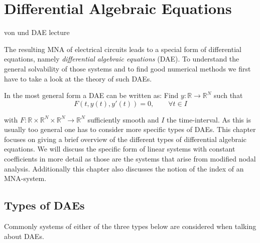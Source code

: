 \chapter{Differential Algebraic Equations}

von \cite{NumerikGewöhnlicherDifferentialgleichungen} und DAE lecture

The resulting MNA of electrical circuits leads to a special form of differential equations, namely \emph{differential algebraic equations} (DAE). To understand the general solvability of those systems and to find good numerical methods we first have to take a look at the theory of such DAEs.

In the most general form a DAE can be written as:
Find $y:\mathbb{R} \to \mathbb{R}^N$ such that
\begin{equation}
	\label{Abstract_DAE}
	F(t, y(t), y'(t)) = 0, \qquad \forall t \in I
\end{equation}

with $F:\mathbb{R} \times \mathbb{R}^N \times \mathbb{R}^N \to \mathbb{R}^N$ sufficiently smooth and $I$ the time-interval. As this is usually too general one has to consider more specific types of DAEs.
This chapter focuses on giving a brief overview of the different types of differential algebraic equations. We will discuss the specific form of linear systems with constant coefficients in more detail as those are the systems that arise from modified nodal analysis. Additionally this chapter also discusses the notion of the index of an MNA-system.

\section{Types of DAEs}

	Commonly systems of either of the three types below are considered when talking about DAEs.
	

